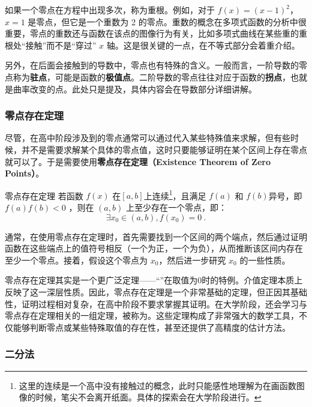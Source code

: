 如果一个零点在方程中出现多次，称为重根。例如，对于 $f(x) = (x - 1)^2$，$x = 1$ 是零点，但它是一个重数为 2 的零点。重数的概念在多项式函数的分析中很重要，零点的重数还与函数在该点的图像行为有关，比如多项式曲线在某些重的重根处“接触”而不是“穿过” $x$ 轴。这是很关键的一点，在不等式部分会着重介绍。

另外，在后面会接触到的导数中，零点也有特殊的含义。一般而言，一阶导数的零点称为\textbf{驻点}，可能是函数的\textbf{极值点}。二阶导数的零点往往对应于函数的\textbf{拐点}，也就是曲率改变的点。此处只是提及，具体内容会在导数部分详细讲解。

\subsubsection{零点存在定理}

尽管，在高中阶段涉及到的零点通常可以通过代入某些特殊值来求解，但有些时候，并不是需要求解某个具体的零点值，这时只要能够证明在某个区间上存在零点就可以了。于是需要使用\textbf{零点存在定理（Existence Theorem of Zero Points）}。

\begin{theorem}{零点存在定理}
若函数 $f(x)$ 在$[a,b]$上连续\footnote{这里的连续是一个高中没有接触过的概念，此时只能感性地理解为在画函数图像的时候，笔尖不会离开纸面。具体的探索会在大学阶段进行。}，且满足 $f(a)$ 和 $f(b)$异号，即$f(a)f(b)<0$ ，则在 $(a, b)$ 上至少存在一个零点，即：
\begin{equation}
\exists x_0\in(a,b),f(x_0)=0~.
\end{equation}
\end{theorem}

通常，在使用零点存在定理时，首先需要找到一个区间的两个端点，然后通过证明函数在这些端点上的值符号相反（一个为正，一个为负），从而推断该区间内存在至少一个零点。接着，假设这个零点为 $x_0$，然后进一步研究 $x_0$ 的一些性质。

零点存在定理其实是一个更广泛定理——“”在取值为0时的特例。介值定理本质上反映了这一深层性质。因此，零点存在定理是一个非常基础的定理，但正因其基础性，证明过程相对复杂，在高中阶段不要求掌握其证明。在大学阶段，还会学习与零点存在定理相关的一组定理，被称为。这些定理构成了非常强大的数学工具，不仅能够判断零点或某些特殊取值的存在性，甚至还提供了高精度的估计方法。

\subsubsection{二分法}

